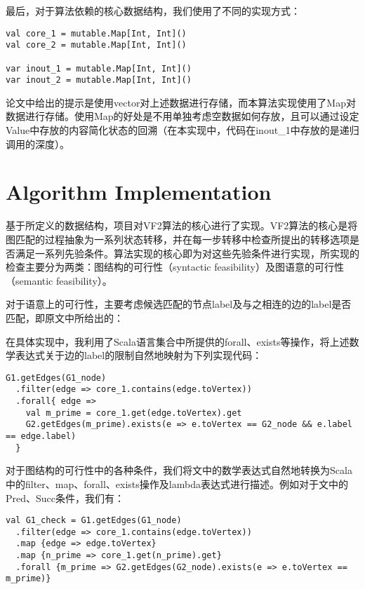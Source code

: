 \documentclass{article}
\begin{document}
最后，对于算法依赖的核心数据结构，我们使用了不同的实现方式：

\begin{lstlisting}[style=mStyle]
val core_1 = mutable.Map[Int, Int]()
val core_2 = mutable.Map[Int, Int]()

var inout_1 = mutable.Map[Int, Int]()
var inout_2 = mutable.Map[Int, Int]()
\end{lstlisting}

论文中给出的提示是使用vector对上述数据进行存储，而本算法实现使用了Map对数据进行存储。使用Map的好处是不用单独考虑空数据如何存放，且可以通过设定Value中存放的内容简化状态的回溯（在本实现中，代码在inout\_1中存放的是递归调用的深度）。

\section{Algorithm Implementation}

基于所定义的数据结构，项目对VF2算法的核心进行了实现。VF2算法的核心是将图匹配的过程抽象为一系列状态转移，并在每一步转移中检查所提出的转移选项是否满足一系列先验条件。算法实现的核心即为对这些先验条件进行实现，所实现的检查主要分为两类：图结构的可行性（syntactic feasibility）及图语意的可行性（semantic feasibility）。

对于语意上的可行性，主要考虑候选匹配的节点label及与之相连的边的label是否匹配，即原文中所给出的：

在具体实现中，我利用了Scala语言集合中所提供的forall、exists等操作，将上述数学表达式关于边的label的限制自然地映射为下列实现代码：
\begin{lstlisting}[style=mStyle]
G1.getEdges(G1_node)
  .filter(edge => core_1.contains(edge.toVertex))
  .forall{ edge =>
    val m_prime = core_1.get(edge.toVertex).get
    G2.getEdges(m_prime).exists(e => e.toVertex == G2_node && e.label == edge.label)
  }
\end{lstlisting}

对于图结构的可行性中的各种条件，我们将文中的数学表达式自然地转换为Scala中的filter、map、forall、exists操作及lambda表达式进行描述。例如对于文中的Pred、Succ条件，我们有：

\begin{lstlisting}[style=mStyle]
val G1_check = G1.getEdges(G1_node)
  .filter(edge => core_1.contains(edge.toVertex))
  .map {edge => edge.toVertex}
  .map {n_prime => core_1.get(n_prime).get}
  .forall {m_prime => G2.getEdges(G2_node).exists(e => e.toVertex == m_prime)}
\end{lstlisting}
\end{document}
